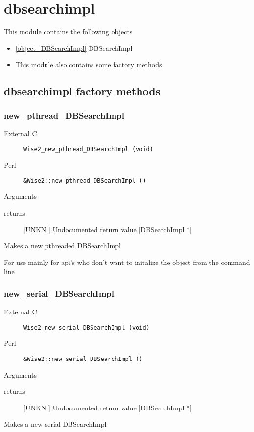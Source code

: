 \section{dbsearchimpl}
\label{module_dbsearchimpl}
This module contains the following objects

\begin{itemize}
\item \ref{object_DBSearchImpl} DBSearchImpl

\item This module also contains some factory methods
\end{itemize}
\subsection{dbsearchimpl factory methods}
\subsubsection{new_pthread_DBSearchImpl}
\begin{description}
\item[External C] {\tt Wise2_new_pthread_DBSearchImpl (void)}
\item[Perl] {\tt &Wise2::new_pthread_DBSearchImpl ()}

\end{description}
Arguments
\begin{description}
\item[returns] [UNKN ] Undocumented return value [DBSearchImpl *]
\end{description}
Makes a new pthreaded DBSearchImpl


For use mainly for api's who don't want
to initalize the object from the command
line


\subsubsection{new_serial_DBSearchImpl}
\begin{description}
\item[External C] {\tt Wise2_new_serial_DBSearchImpl (void)}
\item[Perl] {\tt &Wise2::new_serial_DBSearchImpl ()}

\end{description}
Arguments
\begin{description}
\item[returns] [UNKN ] Undocumented return value [DBSearchImpl *]
\end{description}
Makes a new serial DBSearchImpl


